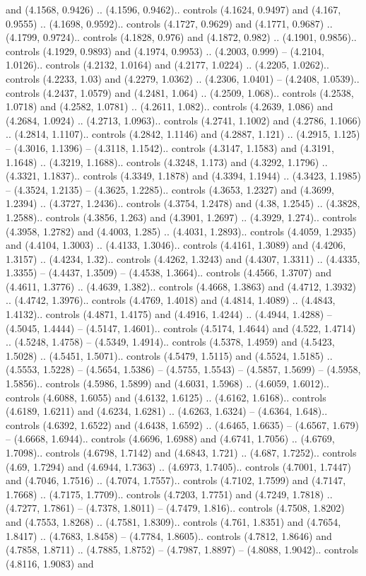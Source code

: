 and (4.1568, 0.9426) .. (4.1596, 0.9462).. controls (4.1624, 0.9497) and (4.167, 0.9555) .. (4.1698, 0.9592).. controls (4.1727, 0.9629) and (4.1771, 0.9687) .. (4.1799, 0.9724).. controls (4.1828, 0.976) and (4.1872, 0.982) .. (4.1901, 0.9856).. controls (4.1929, 0.9893) and (4.1974, 0.9953) .. (4.2003, 0.999) -- (4.2104, 1.0126).. controls (4.2132, 1.0164) and (4.2177, 1.0224) .. (4.2205, 1.0262).. controls (4.2233, 1.03) and (4.2279, 1.0362) .. (4.2306, 1.0401) -- (4.2408, 1.0539).. controls (4.2437, 1.0579) and (4.2481, 1.064) .. (4.2509, 1.068).. controls (4.2538, 1.0718) and (4.2582, 1.0781) .. (4.2611, 1.082).. controls (4.2639, 1.086) and (4.2684, 1.0924) .. (4.2713, 1.0963).. controls (4.2741, 1.1002) and (4.2786, 1.1066) .. (4.2814, 1.1107).. controls (4.2842, 1.1146) and (4.2887, 1.121) .. (4.2915, 1.125) -- (4.3016, 1.1396) -- (4.3118, 1.1542).. controls (4.3147, 1.1583) and (4.3191, 1.1648) .. (4.3219, 1.1688).. controls (4.3248, 1.173) and (4.3292, 1.1796) .. (4.3321, 1.1837).. controls (4.3349, 1.1878) and (4.3394, 1.1944) .. (4.3423, 1.1985) -- (4.3524, 1.2135) -- (4.3625, 1.2285).. controls (4.3653, 1.2327) and (4.3699, 1.2394) .. (4.3727, 1.2436).. controls (4.3754, 1.2478) and (4.38, 1.2545) .. (4.3828, 1.2588).. controls (4.3856, 1.263) and (4.3901, 1.2697) .. (4.3929, 1.274).. controls (4.3958, 1.2782) and (4.4003, 1.285) .. (4.4031, 1.2893).. controls (4.4059, 1.2935) and (4.4104, 1.3003) .. (4.4133, 1.3046).. controls (4.4161, 1.3089) and (4.4206, 1.3157) .. (4.4234, 1.32).. controls (4.4262, 1.3243) and (4.4307, 1.3311) .. (4.4335, 1.3355) -- (4.4437, 1.3509) -- (4.4538, 1.3664).. controls (4.4566, 1.3707) and (4.4611, 1.3776) .. (4.4639, 1.382).. controls (4.4668, 1.3863) and (4.4712, 1.3932) .. (4.4742, 1.3976).. controls (4.4769, 1.4018) and (4.4814, 1.4089) .. (4.4843, 1.4132).. controls (4.4871, 1.4175) and (4.4916, 1.4244) .. (4.4944, 1.4288) -- (4.5045, 1.4444) -- (4.5147, 1.4601).. controls (4.5174, 1.4644) and (4.522, 1.4714) .. (4.5248, 1.4758) -- (4.5349, 1.4914).. controls (4.5378, 1.4959) and (4.5423, 1.5028) .. (4.5451, 1.5071).. controls (4.5479, 1.5115) and (4.5524, 1.5185) .. (4.5553, 1.5228) -- (4.5654, 1.5386) -- (4.5755, 1.5543) -- (4.5857, 1.5699) -- (4.5958, 1.5856).. controls (4.5986, 1.5899) and (4.6031, 1.5968) .. (4.6059, 1.6012).. controls (4.6088, 1.6055) and (4.6132, 1.6125) .. (4.6162, 1.6168).. controls (4.6189, 1.6211) and (4.6234, 1.6281) .. (4.6263, 1.6324) -- (4.6364, 1.648).. controls (4.6392, 1.6522) and (4.6438, 1.6592) .. (4.6465, 1.6635) -- (4.6567, 1.679) -- (4.6668, 1.6944).. controls (4.6696, 1.6988) and (4.6741, 1.7056) .. (4.6769, 1.7098).. controls (4.6798, 1.7142) and (4.6843, 1.721) .. (4.687, 1.7252).. controls (4.69, 1.7294) and (4.6944, 1.7363) .. (4.6973, 1.7405).. controls (4.7001, 1.7447) and (4.7046, 1.7516) .. (4.7074, 1.7557).. controls (4.7102, 1.7599) and (4.7147, 1.7668) .. (4.7175, 1.7709).. controls (4.7203, 1.7751) and (4.7249, 1.7818) .. (4.7277, 1.7861) -- (4.7378, 1.8011) -- (4.7479, 1.816).. controls (4.7508, 1.8202) and (4.7553, 1.8268) .. (4.7581, 1.8309).. controls (4.761, 1.8351) and (4.7654, 1.8417) .. (4.7683, 1.8458) -- (4.7784, 1.8605).. controls (4.7812, 1.8646) and (4.7858, 1.8711) .. (4.7885, 1.8752) -- (4.7987, 1.8897) -- (4.8088, 1.9042).. controls (4.8116, 1.9083) and 